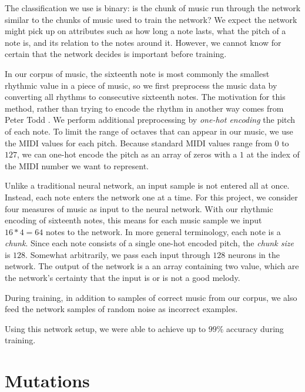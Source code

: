 The classification we use is binary: is the chunk of music run through the network similar to the chunks of music used to train the network?
We expect the network might pick up on attributes such as how long a note lasts, what the pitch of a note is, and its relation to the notes around it.
However, we cannot know for certain that the network decides is important before training.

In our corpus of music, the sixteenth note is most commonly the smallest rhythmic value in a piece of music, so we first preprocess the music data by converting all rhythms to consecutive sixteenth notes.
The motivation for this method, rather than trying to encode the rhythm in another way comes from Peter Todd \cite{todd_connectionist_1989}.
We perform additional preprocessing by \textit{one-hot encoding} the pitch of each note.
To limit the range of octaves that can appear in our music, we use the MIDI values for each pitch.
Because standard MIDI values range from $0$ to $127$, we can one-hot encode the pitch as an array of zeros with a $1$ at the index of the MIDI number we want to represent.

Unlike a traditional neural network, an input sample is not entered all at once.
Instead, each note enters the network one at a time.
For this project, we consider four measures of music as input to the neural network.
With our rhythmic encoding of sixteenth notes, this means for each music sample we input $16 * 4 = 64$ notes to the network.
In more general terminology, each note is a \textit{chunk}.
Since each note consists of a single one-hot encoded pitch, the \textit{chunk size} is $128$.
Somewhat arbitrarily, we pass each input through $128$ neurons in the network.
The output of the network is a an array containing two value, which are the network's certainty that the input is or is not a good melody.

During training, in addition to samples of correct music from our corpus, we also feed the network samples of random noise as incorrect examples.

Using this network setup, we were able to achieve up to $99\%$ accuracy during training.

\section{Mutations} \label{ga:mutate}

